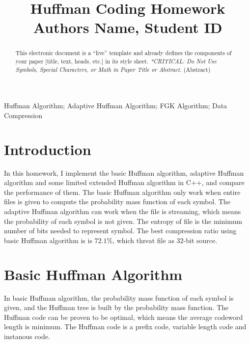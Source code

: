 \documentclass[a4paper,conference]{IEEEtran}
\begin{document}
\renewcommand\footnoterule{{\hrule height 0.5pt}\vspace{0.04in}}
\def\IEEEkeywordsname{Keywords}

\title{Huffman Coding Homework\\
\vspace{-0.1in}
{\normalsize Authors Name, Student ID}
}

\author{}

\maketitle

\begin{abstract}
This electronic document is a “live” template and already defines the components of your paper [title, text, heads, etc.] in its style sheet.
\textit{\color{red} *CRITICAL:  Do Not Use Symbols, Special Characters, or Math in Paper Title or Abstract. }
\normalfont (Abstract)
\end{abstract}

\vspace{0.1in}

\begin{IEEEkeywords}
Huffman Algorithm; Adaptive Huffman Algorithm; FGK Algorithm; Data Compression
\end{IEEEkeywords}

\section{Introduction}
In this homework, I implement the basic Huffman algorithm, adaptive Huffman algorithm and some limited extended Huffman algorithm in C++, and compare the performance of them. The basic Huffman algorithm only work when entire files is given to compute the probability mass function of each symbol. The adaptive Huffman algorithm can work when the file is streaming, which means the probability of each symbol is not given. The entropy of file is the minimum number of bits needed to represent symbol. The best compression ratio using basic Huffman algorithm is is $72.1\%$, which threat file as $32$-bit source.

\section{Basic Huffman Algorithm}

In basic Huffman algorithm, the probability mass function of each symbol is given, and the Huffman tree is built by the probability mass function. The Huffman code can be proven to be optimal, which means the average codeword length is minimum. The Huffman code is a prefix code, variable length code and instanous code.
\end{document}
